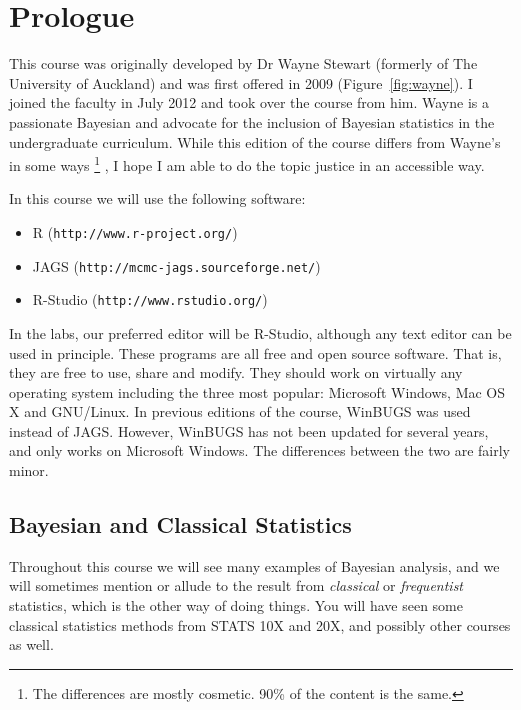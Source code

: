 \section{Prologue}
This course was originally developed by Dr Wayne Stewart (formerly of The
University of
Auckland) and was first offered in 2009 (Figure~\ref{fig:wayne}).
I joined the faculty in July 2012
and took over the course from him. Wayne is a passionate Bayesian and advocate
for the inclusion of Bayesian statistics in the undergraduate curriculum.
While this edition of the course differs from Wayne's in some ways
\footnote{The differences are mostly cosmetic. 90\% of the content is the same.}
, I hope I am able to do the topic justice in an accessible way.

In this course we will use the following software:
\begin{itemize}
\item R ({\tt http://www.r-project.org/}) \\
\item JAGS ({\tt http://mcmc-jags.sourceforge.net/}) \\
\item R-Studio ({\tt http://www.rstudio.org/})
\end{itemize}
In the labs, our preferred editor will be R-Studio, although any text editor
can be used in principle. These programs are all free and open source software.
That is, they are free to use, share and modify. They should work on
virtually any operating system including the three most popular:
Microsoft Windows, Mac OS X and GNU/Linux. In previous editions of the course,
WinBUGS was used instead of JAGS. However, WinBUGS has not been updated for
several years, and only works on Microsoft Windows. The differences between
the two are fairly minor.

\subsection{Bayesian and Classical Statistics}
Throughout this course we will see many examples of Bayesian analysis, and we
will sometimes mention or allude to the result from {\it classical} or
{\it frequentist} statistics, which is the other way of doing things. You will
have seen some classical statistics methods from STATS 10X and 20X, and
possibly other courses as well.

